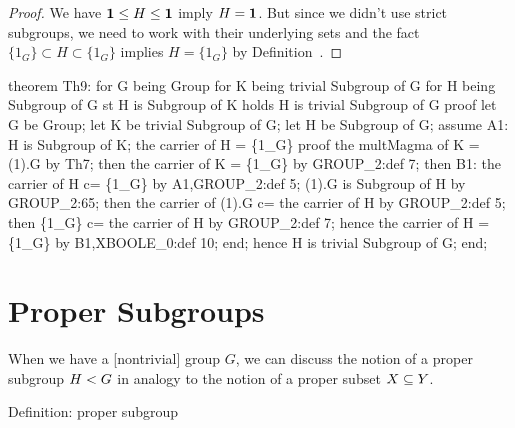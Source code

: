 \begin{proof}
We have $\mathbf{1}\leq H\leq\mathbf{1}$ imply
$H=\mathbf{1}$. But since we didn't use strict subgroups, we need
to work with their underlying sets and the fact $\{1_{G}\}\subset
H\subset\{1_{G}\}$ implies $H=\{1_{G}\}$ by Definition~.
\end{proof}

\nwenddocs{}\endmoddef\nwstartdeflinemarkup{}\nwenddeflinemarkup
theorem Th9:
  for G being Group
  for K being trivial Subgroup of G
  for H being Subgroup of G
  st H is Subgroup of K
  holds H is trivial Subgroup of G
proof
  let G be Group;
  let K be trivial Subgroup of G;
  let H be Subgroup of G;
  assume A1: H is Subgroup of K;
  the carrier of H = \{1_G\}
  proof
    the multMagma of K = (1).G by Th7;
    then the carrier of K = \{1_G\} by GROUP_2:def 7;
    then B1: the carrier of H c= \{1_G\} by A1,GROUP_2:def 5;
    (1).G is Subgroup of H by GROUP_2:65;
    then the carrier of (1).G c= the carrier of H by GROUP_2:def 5;
    then \{1_G\} c= the carrier of H by GROUP_2:def 7;
    hence the carrier of H = \{1_G\} by B1,XBOOLE_0:def 10;
  end;
  hence H is trivial Subgroup of G;
end;
\eatline
{}\nwendcode{}\nwdocspar
\section{Proper Subgroups}
When we have a [nontrivial] group $G$, we can discuss the notion of a
proper subgroup $H< G$ in analogy to the notion of a
proper subset $X\properSubset Y$.

\nwenddocs{}\endmoddef\nwstartdeflinemarkup{}\nwenddeflinemarkup
\LA{}Definition: proper subgroup~{\nwtagstyle{}}\RA{}

